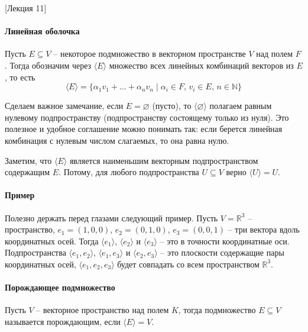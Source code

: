 [Лекция 11]


\paragraph{Линейная оболочка}

\begin{definition}
Пусть $E\subseteq V$ -- некоторое подмножество в векторном пространстве $V$ над полем $F$.
Тогда обозначим через $\langle E \rangle$ множество всех линейных комбинаций векторов из $E$, то есть
\[
\langle E \rangle = \{\alpha_1 v_1 + \ldots + \alpha_n v_n \mid \alpha_i\in F,\, v_i \in E,\, n\in\mathbb N\}
\]
\end{definition}

Сделаем важное замечание, если $E = \varnothing$ (пусто), то $\langle \varnothing \rangle$ полагаем равным нулевому подпространству (подпространству состоящему только из нуля).
Это полезное и удобное соглашение можно понимать так: если берется линейная комбинация с нулевым числом слагаемых, то она равна нулю.

Заметим, что $\langle E \rangle$ является наименьшим векторным подпространством содержащим $E$.
Потому, для любого подпространства $U\subseteq V$ верно $\langle U \rangle  = U$.


\paragraph{Пример}

Полезно держать перед глазами следующий пример.
Пусть $V = \mathbb R^3$ -- пространство, $e_1 =(1,0,0)$, $e_2 = (0,1,0)$, $e_3 = (0,0,1)$ -- три вектора вдоль координатных осей.
Тогда $\langle e_1\rangle$, $\langle e_2\rangle$ и $\langle e_3\rangle$ -- это в точности координатные оси.
Подпространства $\langle e_1, e_2\rangle$, $\langle e_1, e_3\rangle$ и $\langle e_2, e_3\rangle$ -- это плоскости содержащие пары координатных осей, $\langle e_1, e_2, e_3\rangle$ будет совпадать со всем пространством $\mathbb R^3$.

\paragraph{Порождающее подмножество}

\begin{definition}
Пусть $V$ -- векторное пространство над полем $K$, тогда подмножество $E\subseteq V$ называется порождающим, если $\langle E \rangle  = V$.
\end{definition}

